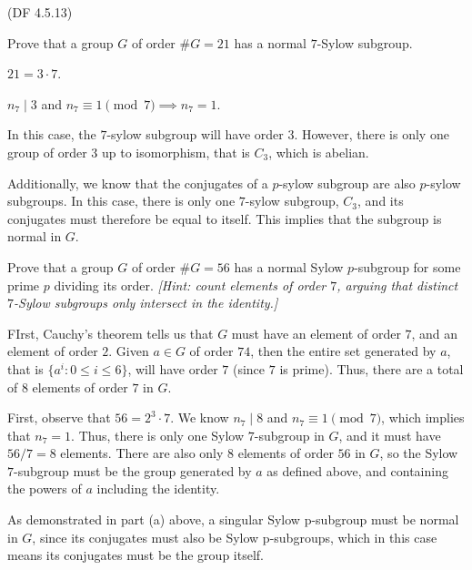 \begin{problem}{(\textsf{DF 4.5.13})}
  \begin{enumalph}
    \item Prove that a group $G$ of order $\#G=21$ has a normal $7$-Sylow subgroup.
    \begin{Answer}
      $21 = 3 \cdot 7$.
      \begin{enumalph}
        \item $n_7 \mid 3$ and $n_7 \equiv 1 \pmod 7 \implies n_7 = 1$.
        
        \noindent
        In this case, the $7$-sylow subgroup will have order $3$.
        However, there is only one group of order $3$ up to isomorphism,
        that is $C_3$, which is abelian.

        \noindent
        Additionally, we know that the conjugates of a $p$-sylow subgroup
        are also $p$-sylow subgroups. In this case, there is only one
        $7$-sylow subgroup, $C_3$, and its conjugates must therefore
        be equal to itself. This implies that the subgroup is normal in $G$.
      \end{enumalph}
    \end{Answer}
    \item Prove that a group $G$ of order $\#G=56$ has a normal Sylow $p$-subgroup
      for some prime $p$ dividing its order.
      \emph{[Hint: count elements of order $7$, arguing that distinct
      $7$-Sylow subgroups only intersect in the identity.]}
    \begin{Answer}
      
      FIrst, Cauchy's theorem tells us that $G$ must have an element of order $7$,
      and an element of order $2$.
      Given $a \in G$ of order $74$, then the entire set generated by $a$,
      that is $\{ a^i \colon 0 \le i \le 6 \}$, will have order $7$ (since $7$ is prime).
      Thus, there are a total of $8$ elements of order $7$ in $G$.
      
      First, observe that $56 = 2^3 \cdot 7$.
      We know  $n_7 \mid 8$ and $n_7 \equiv 1 \pmod 7$, which implies that $n_7 = 1$.
      Thus, there is only one Sylow $7$-subgroup in $G$, and it must have $56/7 = 8$ elements.
      There are also only $8$ elements of order $56$ in $G$, so the Sylow $7$-subgroup
      must be the group generated by $a$ as defined above, and containing the powers
      of $a$ including the identity.

      As demonstrated in part (a) above, a singular Sylow p-subgroup must be normal
      in $G$, since its conjugates must also be Sylow p-subgroups, which in this case
      means its conjugates must be the group itself.
    \end{Answer}
  \end{enumalph}
\end{problem}
